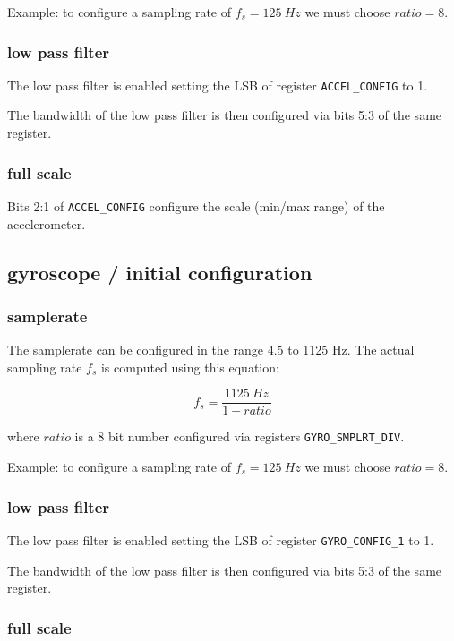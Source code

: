 \documentclass[paper=a4, oneside, fontsize=11pt,
parskip=full]{scrartcl}
\begin{document}
Example: to configure a sampling rate of $f_s = 125~Hz$ we must choose $ratio = 8$.

\subsubsection{low pass filter}

The low pass filter is enabled setting the LSB of register \verb|ACCEL_CONFIG| to 1.

The bandwidth of the low pass filter is then configured via bits 5:3 of the same register.

\subsubsection{full scale}

Bits 2:1 of \verb|ACCEL_CONFIG| configure the scale (min/max range) of the accelerometer. 

\subsection{gyroscope / initial configuration}

\subsubsection{samplerate}

The samplerate can be configured in the range 4.5 to 1125 Hz. The actual sampling rate $f_s$ is computed using this equation:

\[
f_s = \frac{1125~Hz}{1 + ratio}
\]

where $ratio$ is a 8 bit number configured via registers \verb|GYRO_SMPLRT_DIV|.

Example: to configure a sampling rate of $f_s = 125~Hz$ we must choose $ratio = 8$.

\subsubsection{low pass filter}

The low pass filter is enabled setting the LSB of register \verb|GYRO_CONFIG_1| to 1.

The bandwidth of the low pass filter is then configured via bits 5:3 of the same register.

\subsubsection{full scale}
\end{document}
